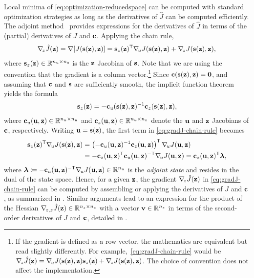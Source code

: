 Local minima of \cref{eq:optimization-reducedspace} can be computed with standard optimization strategies as long as the derivatives of $\hat{J}$ can be computed efficiently.
The adjoint method~\cite{courant1962physics,givoli2021adjoint,tarantola2005inverse} provides expressions for the derivatives of $\hat{J}$ in terms of the (partial) derivatives of $J$ and $\mathbf{c}$.
Applying the chain rule,
\begin{align}
    \label{eq:gradJ-chain-rule}
    \nabla_{\!z}\hat{J}(\mathbf{z})
    = \nabla[J(\mathbf{s}(\mathbf{z}),\mathbf{z})]
    = \mathbf{s}_z(\mathbf{z})^{\mathsf{T}}\nabla_{\!u}J(\mathbf{s}(\mathbf{z}),\mathbf{z}) + \nabla_{\!z}J(\mathbf{s}(\mathbf{z}),\mathbf{z}),
\end{align}
where $\mathbf{s}_z(\mathbf{z})\in\mathbb{R}^{n_u\times n_z}$ is the $\mathbf{z}$ Jacobian of $\mathbf{s}$.
Note that we are using the convention that the gradient is a column vector.\footnote{If the gradient is defined as a row vector, the mathematics are equivalent but read slightly differently. For example,~\cref{eq:gradJ-chain-rule} would be $\nabla_{\!z}\hat{J}(\mathbf{z}) = \nabla_{\!u}J(\mathbf{s}(\mathbf{z}),\mathbf{z})\mathbf{s}_z(\mathbf{z}) + \nabla_{\!z}J(\mathbf{s}(\mathbf{z}),\mathbf{z})$. The choice of convention does not affect the implementation.}
Since $\mathbf{c}(\mathbf{s}(\mathbf{z}),\mathbf{z}) = \mathbf{0}$, and assuming that $\mathbf{c}$ and $\mathbf{s}$ are sufficiently smooth, the implicit function theorem yields the formula
\begin{align}
    \label{eq:Sz-implicit-function}
    \mathbf{s}_z(\mathbf{z})
    = -\mathbf{c}_u(\mathbf{s}(\mathbf{z}),\mathbf{z})^{-1}\mathbf{c}_z(\mathbf{s}(\mathbf{z}),\mathbf{z}),
\end{align}
where $\mathbf{c}_u(\mathbf{u},\mathbf{z})\in\mathbb{R}^{n_u\times n_u}$ and $\mathbf{c}_z(\mathbf{u},\mathbf{z})\in\mathbb{R}^{n_u\times n_z}$ denote the $\mathbf{u}$ and $\mathbf{z}$ Jacobians of $\mathbf{c}$, respectively.
Writing $\mathbf{u} = \mathbf{s}(\mathbf{z})$, the first term in \cref{eq:gradJ-chain-rule} becomes
\begin{align}
    \begin{aligned}
    \mathbf{s}_z(\mathbf{z})^{\mathsf{T}}\nabla_{\!u}J(\mathbf{s}(\mathbf{z}),\mathbf{z})
    &= \left(-\mathbf{c}_u(\mathbf{u},\mathbf{z})^{-1}\mathbf{c}_z(\mathbf{u},\mathbf{z})\right)^{\mathsf{T}}\nabla_{\!u}J(\mathbf{u},\mathbf{z})
    \\
    &= -\mathbf{c}_z(\mathbf{u},\mathbf{z})^{\mathsf{T}}\mathbf{c}_u(\mathbf{u},\mathbf{z})^{-\mathsf{T}}\nabla_{\!u}J(\mathbf{u},\mathbf{z})
    = \mathbf{c}_z(\mathbf{u},\mathbf{z})^{\mathsf{T}}\boldsymbol{\lambda},
    \end{aligned}
\end{align}
where $\boldsymbol{\lambda} \coloneqq -\mathbf{c}_u(\mathbf{u},\mathbf{z})^{-\mathsf{T}}\nabla_{\!u}J(\mathbf{u},\mathbf{z}) \in \mathbb{R}^{n_u}$ is the \emph{adjoint state} and resides in the dual of the state space.
Hence, for a given $\mathbf{z}$, the gradient $\nabla_{\!z}\hat{J}(\mathbf{z})$ in \cref{eq:gradJ-chain-rule} can be computed by assembling or applying the derivatives of $J$ and $\mathbf{c}$, as summarized in .
Similar arguments lead to an expression for the product of the Hessian $\nabla_{\!z,z}\hat{J}(\mathbf{z}) \in\mathbb{R}^{n_z\times n_z}$ with a vector $\mathbf{v}\in\mathbb{R}^{n_z}$ in terms of the second-order derivatives of $J$ and $\mathbf{c}$, detailed in .
